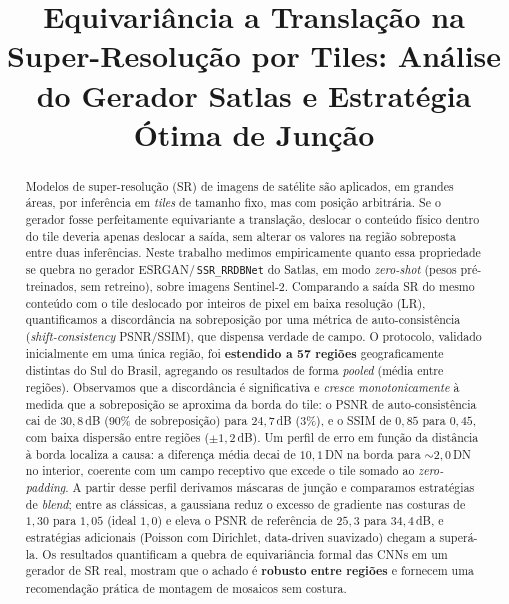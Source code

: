 \documentclass[conference]{IEEEtran}
\begin{document}
\title{Equivariância a Translação na Super-Resolução por Tiles:
Análise do Gerador Satlas e Estratégia Ótima de Junção}

\author{
}

\maketitle

\begin{abstract}
Modelos de super-resolução (SR) de imagens de satélite são aplicados, em grandes
áreas, por inferência em \textit{tiles} de tamanho fixo, mas com posição arbitrária.
Se o gerador fosse perfeitamente equivariante a translação, deslocar o conteúdo
físico dentro do tile deveria apenas deslocar a saída, sem alterar os valores na
região sobreposta entre duas inferências. Neste trabalho medimos empiricamente quanto
essa propriedade se quebra no gerador ESRGAN/\,\texttt{SSR\_RRDBNet} do Satlas, em
modo \emph{zero-shot} (pesos pré-treinados, sem retreino), sobre imagens Sentinel-2.
Comparando a saída SR do mesmo conteúdo com o tile deslocado por inteiros de pixel em
baixa resolução (LR), quantificamos a discordância na sobreposição por uma métrica de
auto-consistência (\textit{shift-consistency} PSNR/SSIM), que dispensa verdade de
campo. O protocolo, validado inicialmente em uma única região, foi \textbf{estendido a
57 regiões} geograficamente distintas do Sul do Brasil, agregando os resultados de forma
\emph{pooled} (média entre regiões). Observamos que a discordância é significativa e
\emph{cresce monotonicamente} à medida que a sobreposição se aproxima da borda do tile:
o PSNR de auto-consistência cai de $30{,}8$\,dB (90\% de sobreposição) para $24{,}7$\,dB
(3\%), e o SSIM de $0{,}85$ para $0{,}45$, com baixa dispersão entre regiões
($\pm1{,}2$\,dB). Um perfil de erro em função da distância à borda localiza a causa: a
diferença média decai de $10{,}1$\,DN na borda para ${\sim}2{,}0$\,DN no interior,
coerente com um campo receptivo que excede o tile somado ao \textit{zero-padding}. A
partir desse perfil derivamos máscaras de junção e comparamos estratégias de
\textit{blend}; entre as clássicas, a gaussiana reduz o excesso de gradiente nas costuras
de $1{,}30$ para $1{,}05$ (ideal $1{,}0$) e eleva o PSNR de referência de $25{,}3$ para
$34{,}4$\,dB, e estratégias adicionais (Poisson com Dirichlet, data-driven suavizado)
chegam a superá-la. Os resultados quantificam a quebra de equivariância formal das CNNs
em um gerador de SR real, mostram que o achado é \textbf{robusto entre regiões} e
fornecem uma recomendação prática de montagem de mosaicos sem costura.
\end{abstract}
\end{document}
